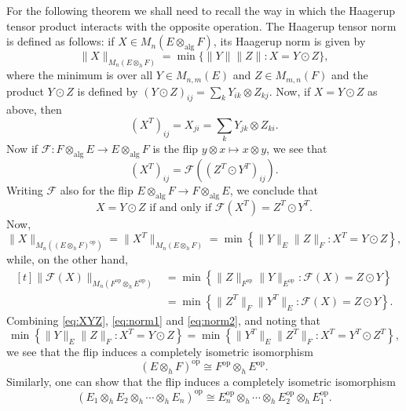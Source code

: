 \documentclass[12pt]{amsart}
\numberwithin{equation}{section}
\theoremstyle{definition}
\newcommand{\be}{\begin{equation}}
\newcommand{\ee}{\end{equation}}
\newcommand{\cF}{\mathcal{F}}
\newcommand{\alg}{\operatorname{alg}}
\DeclareMathOperator{\op}{op}
\begin{document}
For the following theorem we shall need to recall the way in which the Haagerup tensor product interacts with the opposite operation. 
The Haagerup tensor norm is defined as follows: if $X \in M_n(E \otimes_{\alg} F)$, its Haagerup norm is given by 
\[
\|X\|_{M_n(E\otimes_h F)} = \min\{\|Y\|\|Z\| :  X = Y \odot Z \},
\]
where the minimum is over all $Y \in M_{n,m}(E)$ and $Z \in M_{m,n}(F)$ and the product $Y \odot Z$ is defined by $(Y \odot Z)_{ij} = \sum_k Y_{ik} \otimes Z_{kj}$. 
Now, if $X = Y \odot Z$ as above, then 
\[
(X^T)_{ij} = X_{ji} = \sum_k Y_{jk} \otimes Z_{ki}. 
\]
Now if $\cF \colon F \otimes_{\alg} E \to E \otimes_{\alg} F$ is the flip $y \otimes x \mapsto x \otimes y$, we see that 
\[
(X^T)_{ij} = \cF \left( (Z^T \odot Y^T)_{ij} \right). 
\]
Writing $\cF$ also for the flip $E \otimes_{\alg} F \to F \otimes_{\alg} E$, we conclude that 
\be\label{eq:XYZ}
X = Y \odot Z \textrm{ if and only if } \cF(X^T) = Z^T \odot Y^T .
\ee
Now,
\be\label{eq:norm1}
\|X\|_{M_n((E \otimes_h F)^{\op})} = \|X^T\|_{M_n(E \otimes_h F)} = \min\left\{\|Y\|_E \|Z\|_F : X^T = Y \odot Z \right\}, 
\ee
while, on the other hand, 
\begin{equation}
\begin{aligned}[t]
\|\cF(X)\|_{M_n(F^{\op} \otimes_h E^{\op})} 
&= \min\left\{ \|Z\|_{F^{\op}} \|Y\|_{E^{\op}} : \cF(X) = Z \odot Y \right\} \\
&= \min\left\{ \|Z^T\|_F \|Y^T\|_E : \cF(X) = Z \odot Y \right\}. 
\end{aligned}
\label{eq:norm2}
\end{equation}
Combining \eqref{eq:XYZ}, \eqref{eq:norm1} and \eqref{eq:norm2}, and noting that 
\[
\min\left\{\|Y\|_E \|Z\|_F : X^T = Y \odot Z \right\} = \min\left\{\|Y^T\|_E \|Z^T\|_F : X^T = Y^T \odot Z^T \right\},
\]we see that the flip induces a completely isometric isomorphism 
\[
(E \otimes_h F)^{\op} \cong F^{\op} \otimes_h E^{\op}. 
\]
Similarly, one can show that the flip induces a completely isometric isomorphism
\[
(E_1 \otimes_h E_2 \otimes_h \cdots \otimes_h E_n)^{\op} \cong E_n^{\op} \otimes_h \cdots \otimes_h E_2^{\op} \otimes_h E_1^{\op}. 
\]
\end{document}
